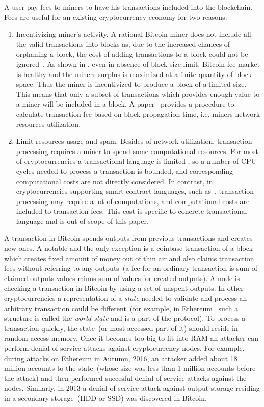 \documentclass[]{llncs}   %
\begin{document}
A user pay fees to miners to have his transactions included into the blockchain. Fees are useful for an existing cryptocurrency economy for two reasons:

\begin{enumerate}
  \item{Incentivizing miner's activity. } A rational Bitcoin miner does not include all the valid transactions into blocks as, due to the increased chances of orphaning a block, the cost of adding transactions to a block could not be ignored~\cite{andersen2013,rizun2015transaction}. As shown in \cite{rizun2015transaction}, even in absence of block size limit, Bitcoin fee market is healthy and the miners surplus is maximized at a finite quantity of block space. Thus the miner is incentivized to produce a block of a limited size. This means that only a subset of transactions which provides enough value to a miner will be included in a block. A paper~\cite{rizun2015transaction} provides a procedure to calculate transaction fee based on block propagation time, i.e. miners network resources utilization.

  \item{Limit resources usage and spam. } Besides of network utilization, transaction processing requires a miner to spend some computational resources. For most of cryptocurrencies a transactional language is limited \cite{script}, so a number of CPU cycles needed to process a transaction is bounded, and corresponding computational costs are not directly considered. In contrast, in cryptocurrencies supporting  smart contract languages, such as~\cite{seijas2016scripting,tezosScript,solidity}, transaction processing may require a lot of computations, and computational costs are included to transaction fees. This cost is specific to concrete transactional language and is out of scope of this paper.
\end{enumerate}

A transaction in Bitcoin spends outputs from previous transactions and creates new ones. A notable and the only exception is a coinbase transaction of a block which creates fixed amount of money out of thin air and also claims transaction fees without referring to any outputs~(a fee for an ordinary transaction is sum of claimed outputs values minus sum of values for created outputs). A node is checking a transaction in Bitcoin by using a set of unspent outputs. In other cryptocurrencies a representation of a \textit{state} needed to validate and process an arbitrary transaction could be different~(for example, in Ethereum~\cite{ethyp} such a structure is called the \textit{world state} and is a part of the protocol). To process a transaction quickly, the state~(or most accessed part of it) should reside in random-access memory. Once it becomes too big to fit into RAM an attacker can perform denial-of-service attacks against cryptocurrency nodes. For example, during attacks on Ethereum in Autumn, 2016, an attacker added about 18 million accounts to the state~(whose size was less than 1 million accounts before the attack) and then performed succesful denial-of-service attacks against the nodes. Similarly, in 2013 a denial-of-service attack against output storage residing in a secondary storage~(HDD or SSD) was discovered in Bitcoin. 
\end{document}
